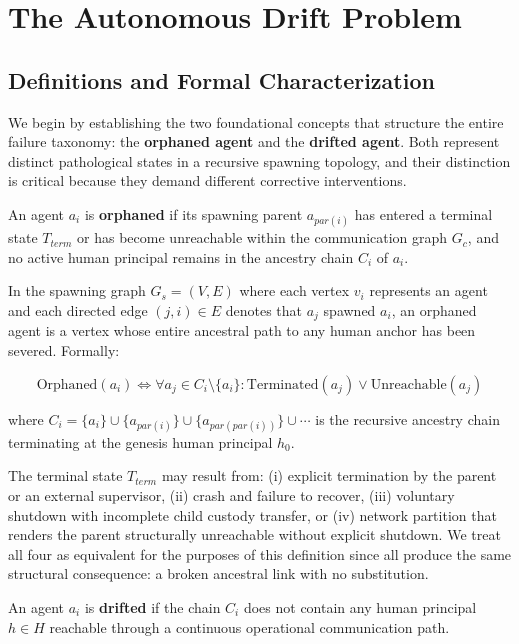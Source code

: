 \section{The Autonomous Drift Problem}

\subsection{Definitions and Formal Characterization}

We begin by establishing the two foundational concepts that structure the entire failure taxonomy: the \textbf{orphaned agent} and the \textbf{drifted agent}. Both represent distinct pathological states in a recursive spawning topology, and their distinction is critical because they demand different corrective interventions.

\begin{definition}
An agent $a_i$ is \textbf{orphaned} if its spawning parent $a_{par(i)}$ has entered a terminal state $T_{term}$ or has become unreachable within the communication graph $G_c$, and no active human principal remains in the ancestry chain $C_i$ of $a_i$.
\end{definition}

In the spawning graph $G_s = (V, E)$ where each vertex $v_i$ represents an agent and each directed edge $(j, i) \in E$ denotes that $a_j$ spawned $a_i$, an orphaned agent is a vertex whose entire ancestral path to any human anchor has been severed. Formally:

\[
\text{Orphaned}(a_i) \iff \forall a_j \in C_i \setminus \{a_i\} : \text{Terminated}(a_j) \lor \text{Unreachable}(a_j)
\]

where $C_i = \{a_i\} \cup \{a_{par(i)}\} \cup \{a_{par(par(i))}\} \cup \cdots$ is the recursive ancestry chain terminating at the genesis human principal $h_0$.

The terminal state $T_{term}$ may result from: (i) explicit termination by the parent or an external supervisor, (ii) crash and failure to recover, (iii) voluntary shutdown with incomplete child custody transfer, or (iv) network partition that renders the parent structurally unreachable without explicit shutdown. We treat all four as equivalent for the purposes of this definition since all produce the same structural consequence: a broken ancestral link with no substitution.

\begin{definition}
An agent $a_i$ is \textbf{drifted} if the chain $C_i$ does not contain any human principal $h \in H$ reachable through a continuous operational communication path.
\end{definition}

